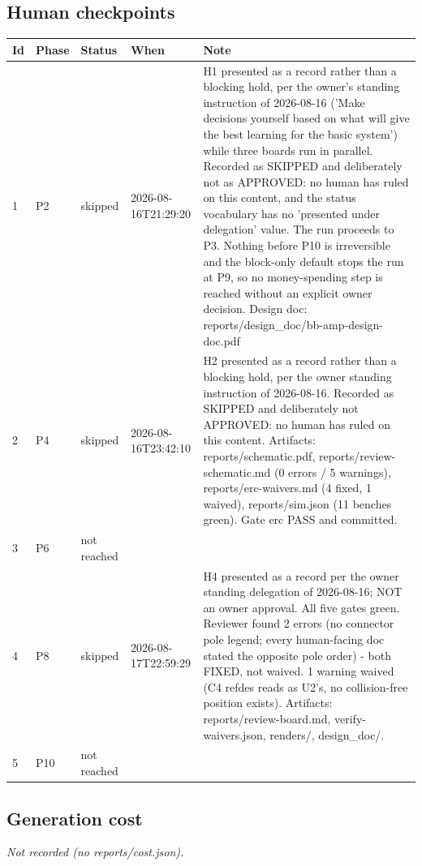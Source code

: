 \documentclass[11pt,a4paper]{article}
\begin{document}
\subsection*{Human checkpoints}
{\small
\begin{longtable}{lllp{2.6cm}p{6.4cm}}
\toprule
\textbf{Id} & \textbf{Phase} & \textbf{Status} & \textbf{When} & \textbf{Note} \\
\midrule
\endhead
1 & P2 & skipped & 2026-08-16T21:29:20 & H1 presented as a record rather than a blocking hold, per the owner's standing instruction of 2026-08-16 ('Make decisions yourself based on what will give the best learning for the basic system') while three boards run in parallel. Recorded as SKIPPED and deliberately not as APPROVED: no human has ruled on this content, and the status vocabulary has no 'presented under delegation' value. The run proceeds to P3. Nothing before P10 is irreversible and the block-only default stops the run at P9, so no money-spending step is reached without an explicit owner decision. Design doc: reports/design\_doc/bb-amp-design-doc.pdf \\
2 & P4 & skipped & 2026-08-16T23:42:10 & H2 presented as a record rather than a blocking hold, per the owner standing instruction of 2026-08-16. Recorded as SKIPPED and deliberately not APPROVED: no human has ruled on this content. Artifacts: reports/schematic.pdf, reports/review-schematic.md (0 errors / 5 warnings), reports/erc-waivers.md (4 fixed, 1 waived), reports/sim.json (11 benches green). Gate erc PASS and committed. \\
3 & P6 & not reached &  &  \\
4 & P8 & skipped & 2026-08-17T22:59:29 & H4 presented as a record per the owner standing delegation of 2026-08-16; NOT an owner approval. All five gates green. Reviewer found 2 errors (no connector pole legend; every human-facing doc stated the opposite pole order) - both FIXED, not waived. 1 warning waived (C4 refdes reads as U2's, no collision-free position exists). Artifacts: reports/review-board.md, verify-waivers.json, renders/, design\_doc/. \\
5 & P10 & not reached &  &  \\
\bottomrule
\end{longtable}
}
\subsection*{Generation cost}
\emph{Not recorded (no reports/cost.json).}
\end{document}
